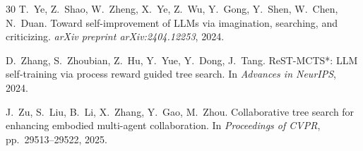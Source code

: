 \documentclass[pdflatex,sn-mathphys-num]{sn-jnl}
\theoremstyle{thmstyleone}
\theoremstyle{thmstyletwo}
\theoremstyle{thmstylethree}
\begin{document}
\begin{thebibliography}{30}
T.~Ye, Z.~Shao, W.~Zheng, X.~Ye, Z.~Wu, Y.~Gong, Y.~Shen,
W.~Chen, N.~Duan.
Toward self-improvement of LLMs via imagination, searching, and
criticizing.
\textit{arXiv preprint arXiv:2404.12253}, 2024.

D.~Zhang, S.~Zhoubian, Z.~Hu, Y.~Yue, Y.~Dong, J.~Tang.
ReST-MCTS*: LLM self-training via process reward guided tree search.
In \textit{Advances in NeurIPS}, 2024.

J.~Zu, S.~Liu, B.~Li, X.~Zhang, Y.~Gao, M.~Zhou.
Collaborative tree search for enhancing embodied multi-agent
collaboration.
In \textit{Proceedings of CVPR}, pp.~29513--29522, 2025.

\end{thebibliography}
\end{document}
